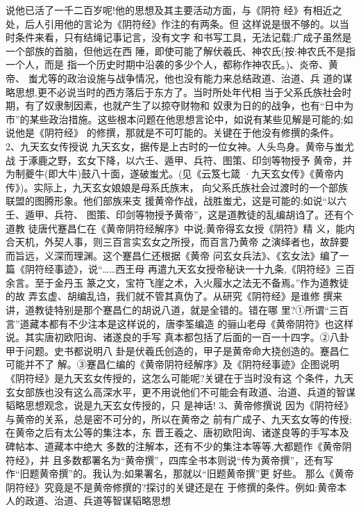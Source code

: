 \documentclass[12pt,UTF8]{ctexbook}
\begin{document}
说他已活了一千二百岁呢!他的思想及其主要活动方面，与《阴符
经》有相近之处，后人引用他的言论为《阴符经》作注的有两条。但
这样说是很不够的。以当时条件来看，只有结绳记事记言，没有文字
和书写工具，无法记载;广成子虽然是一个部族的首脑，但他远在西
陲，即使可能了解伏羲氏、神农氏(按:神农氏不是指一个人，而是
指一个历史时期中沿袭的多少个人，都称作神农氏。)、炎帝、黄帝、
蚩尤等的政治设施与战争情况，他也没有能力来总结政道、治道、兵
道的谋略思想,更不必说当时的西方落后于东方了。当时所处年代相
当于父系氏族社会时期，有了奴隶制因素，也就产生了以掠夺财物和
奴隶为日的的战争，也有“日中为市”的某些政治措施。这些根本问题在他思想言论中，如说有某些见解是可能的;如说他是《阴符经》
的修撰，那就是不可叮能的。关键在于他没有修撰的条件。
2、九天玄女传授说
九天玄女，据传是上古时的一位女神。人头鸟身。黄帝与蚩尤战
于涿鹿之野，玄女下降，以六壬、遁甲、兵符、图策、印剑等物授予
黄帝，并为制夔牛(即大牛)鼓八十面，遂破蚩尤。(见《云笈七箴
·九天玄女传》《黄帝内传》)。实际上，九天玄女娘娘是母系氏族末，
向父系氏族社会过渡时的一个部族联盟的图腾形象。他们部族来支
援黄帝作战，战胜蚩尤，这是可能的;如说“以六壬、遁甲、兵符、
图策、印剑等物授予黄帝”，这是道教徒的乱编胡诌了。还有个道教
徒唐代蹇昌仁在《黄帝阴符经解序》中说:黄帝得玄女授《阴符》精
义，能内合天机，外契人事，则三百言实玄女之所授，而百言乃黄帝
之演绎者也，故辞要而旨远，义深而理渊。这个蹇昌仁还根据《黄帝
问玄女兵法》、《玄女法》编了一篇《阴符经事迹》，说“……西王母
再遣九天玄女授帝秘诀一十九条,《阴符经》三百余言。至于金丹玉
篆之文，宝符飞崖之术，入火履水之法无不备焉。”作为道教徒的故
弄玄虚、胡编乱诌，我们就不管其真伪了。从研究《阴符经》是谁修
撰来讲，道教徒特别是那个蹇昌仁的胡说八道，就是全错的。错在哪
里?①所谓“三百言”道藏本都有不少注本是这样说的，唐李筌编造
的骊山老母《黄帝阴符》也这样说。其实唐初欧阳询、诸遂良的手写
真本都包括了后面的一百一十四字。②八卦甲于问题。史书都说明八
卦是伏羲氏创造的，甲子是黄帝命大挠创造的。蹇昌仁可能并不了
解。③蹇昌仁编的《黄帝阴符经解序》及《阴符经事迹》企图说明
《阴符经》是九天玄女传授的，这怎么可能呢?关键在于当时没有这
个条件，九天玄女部族也没有这么高深水平，更不用说他们不可能会有政道、治道、兵道的智谋韬略思想观念，说是九天玄女传授的，只
是神话!
3、黄帝修撰说
因为《阴符经》与黄帝的关系，总是密不可分的，所以在黄帝之
前有广成子、九天玄女等的传授;在黄帝之后有太公等的集注本，东
晋王羲之、唐初欧阳询、诸遂良等的手写本及碑帖本、道藏本中绝大
多数的注解本，还有不少的集注本等等,大都题作《黄帝阴符经》，并
且多数都署名为“黄帝撰”，四库全书本则说“传为黄帝撰”，还有写
作“旧题黄帝撰”的。我认为;如果署名，那就以“旧题黄帝撰”更
好些。
那么《黄帝阴符经》究竟是不是黄帝修撰的?探讨的关键还是在
于修撰的条件。例如:黄帝本人的政道、治道、兵道等智谋韬略思想
\end{document}
